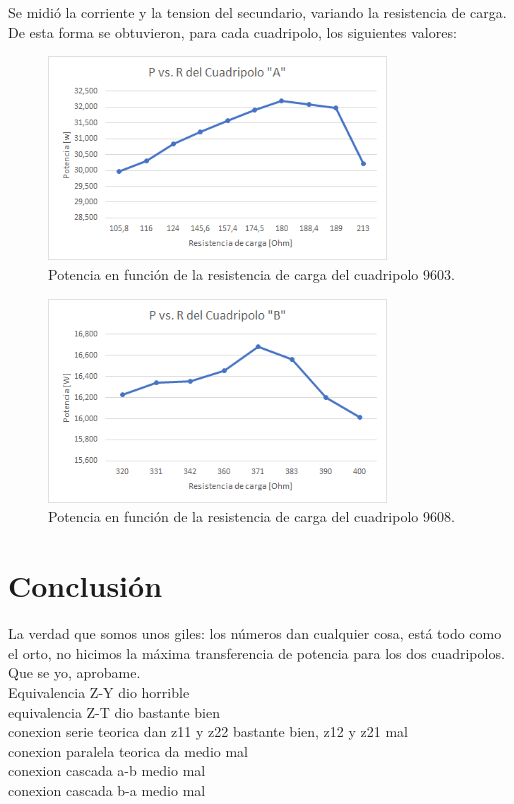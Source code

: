 \documentclass[a4paper]{article}
\begin{document}
Se midió la corriente y la tension del secundario, variando la resistencia de carga. De esta forma se obtuvieron, para cada cuadripolo, los siguientes valores:

\begin{figure}[H]
	\centering
	\includegraphics[width=0.8\textwidth]{Potencia-A}
	\caption{Potencia en función de la resistencia de carga del cuadripolo 9603.}
	\label{fig:PA}
\end{figure}

\begin{figure}[H]
	\centering
	\includegraphics[width=0.8\textwidth]{Potencia-B}
	\caption{Potencia en función de la resistencia de carga del cuadripolo 9608.}
	\label{fig:PB}
\end{figure}

\section*{Conclusión}

La verdad que somos unos giles: los números dan cualquier cosa, está todo como el orto, no hicimos la máxima transferencia de potencia para los dos cuadripolos. Que se yo, aprobame.\\

Equivalencia Z-Y dio horrible\\
equivalencia Z-T dio bastante bien\\

conexion serie teorica dan z11 y z22 bastante bien, z12 y z21 mal\\
conexion paralela teorica da medio mal\\

conexion cascada a-b medio mal\\
conexion cascada b-a medio mal\\
\end{document}
